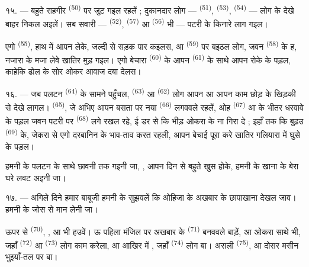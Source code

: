१५. --- बहुते राहगीर  \textsuperscript{(50)} पर जुट गइल
रहलें ; दुकानदार लोग —  \textsuperscript{(51)},
 \textsuperscript{(53)}, 
\textsuperscript{(54)} —  लोग के देखे बाहर निकल अइलें। सब
सवारी —  \textsuperscript{(52)},  \textsuperscript{(57)} आ 
\textsuperscript{(56)} भी — पटरी के किनारे लाग गइल।

\VUsaut{3.0mm}

एगो  \textsuperscript{(55)}, हाथ में आपन
 लेके, जल्दी से सड़क पार कइलस, आ 
\textsuperscript{(59)} पर बइठल लोग, जवन 
\textsuperscript{(58)} के ह, नजारा के मजा लेवे खातिर मुड़ गइल। एगो बेचारा 
\textsuperscript{(60)} के आपन  \textsuperscript{(61)}
के साथे आपन  रोके के पड़ल, काहेकि ढोल के सोर ओकर आवाज दबा
देलस।

१६. --- जब पलटन  \textsuperscript{(64)} के सामने
पहुँचल,  \textsuperscript{(63)} आ 
\textsuperscript{(62)} लोग आपन  आ आपन काम छोड़ के
खिड़की से देखे लागल।  \textsuperscript{(65)}, जे अभिए आपन
बसता पर नया  \textsuperscript{(66)} लगववले रहलें, ओह
 \textsuperscript{(67)} आ  के भीतर धरवावे
के पड़ल जवन पटरी पर  \textsuperscript{(68)} लगे रखल
रहे, ई डर से कि भीड़ ओकरा के ना गिरा दे ; इहाँ तक कि बुढ़उ  \textsuperscript{(69)} के, जेकरा से एगो दरबानिन  के
भाव-ताव करत रहली, आपन बेचाई पूरा करे खातिर गलियारा में घुसे के पड़ल।

हमनी के पलटन के साथे छावनी तक गइनी जा, , आपन दिन से बहुते
खुस होके, हमनी के खाना के बेरा घरे लवट अइनी जा।

\VUsaut{3.0mm}

१७. --- अगिले दिने हमार बाबूजी हमनी के सुझवलें कि ओहिजा के अखबार के
छापाखाना देखल जाव। हमनी के जोस से मान लेनी जा।

 ऊपर से  \textsuperscript{(70)},
,  आ  भी हउवें।
ऊ पहिला मंजिल पर अखबार के  \textsuperscript{(71)}
बनववले बाड़ें, आ ओकरा साथे  भी, जहाँ  \textsuperscript{(72)} आ  \textsuperscript{(73)}
लोग काम करेला, आ आखिर में , जहाँ
 \textsuperscript{(74)} लोग बा। असली 
\textsuperscript{(75)},  आ दोसर मसीन भुइयाँ-तल पर बा।

